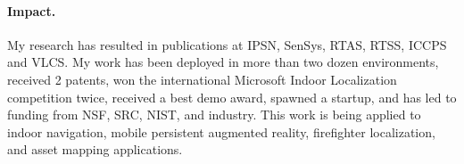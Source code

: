\documentclass[10pt]{article}
\begin{document}

\paragraph{Impact. }
My research has resulted in publications at IPSN, SenSys, RTAS, RTSS, ICCPS and VLCS. My work has been deployed in more than two dozen environments, received 2 patents, won the international Microsoft Indoor Localization competition twice, received a best demo award, spawned a startup, and has led to funding from NSF, SRC, NIST, and industry. This work is being applied to indoor navigation, mobile persistent augmented reality, firefighter localization, and asset mapping applications.
\end{document}
